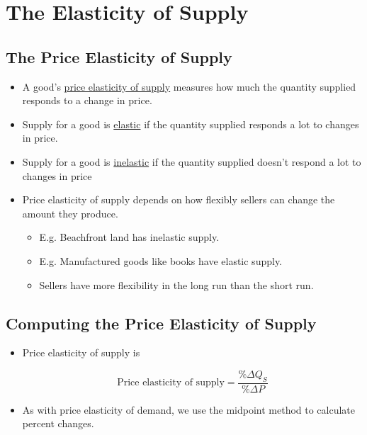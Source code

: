 \section{The Elasticity of Supply}



\subsection{The Price Elasticity of Supply}

\begin{itemize}

\item A good's \underline{price elasticity of supply} measures how much the quantity supplied responds to a change in price. 

\item Supply for a good is \underline{elastic} if the quantity supplied responds a lot to changes in price.

\item Supply for a good is \underline{inelastic} if the quantity supplied doesn't respond a lot to changes in price

\item Price elasticity of supply depends on how flexibly sellers can change the amount they produce.

	\begin{itemize}
	
	\item E.g. Beachfront land has inelastic supply.
	
	\item E.g. Manufactured goods like books have elastic supply.
	
	\item Sellers have more flexibility in the long run than the short run. 
	
	\end{itemize}

\end{itemize}



\subsection{Computing the Price Elasticity of Supply}

\begin{itemize}

\item Price elasticity of supply is

	\[ \text{Price elasticity of supply} = \frac{\% \Delta Q_S}{\% \Delta P} \]
	
\item As with price elasticity of demand, we use the midpoint method to calculate percent changes.

\end{itemize}



